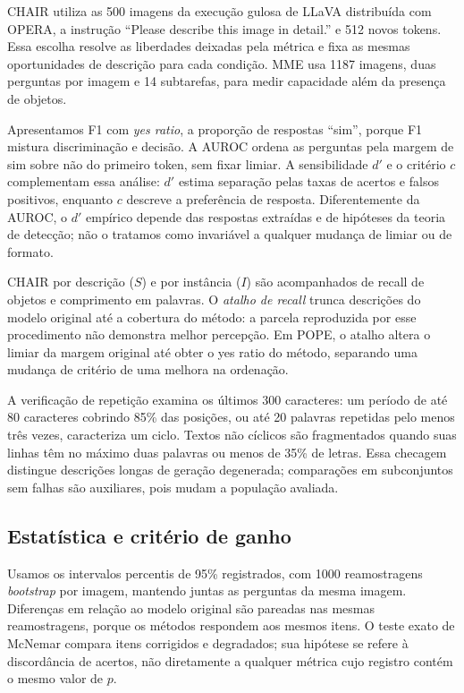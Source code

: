 CHAIR utiliza as 500 imagens da execução gulosa de LLaVA distribuída com OPERA, a instrução ``Please describe this image in detail.'' e 512 novos tokens. Essa escolha resolve as liberdades deixadas pela métrica e fixa as mesmas oportunidades de descrição para cada condição. MME usa 1187 imagens, duas perguntas por imagem e 14 subtarefas, para medir capacidade além da presença de objetos.

Apresentamos F1 com \textit{yes ratio}, a proporção de respostas ``sim'', porque F1 mistura discriminação e decisão. A AUROC ordena as perguntas pela margem de sim sobre não do primeiro token, sem fixar limiar. A sensibilidade $d'$ e o critério $c$ complementam essa análise: $d'$ estima separação pelas taxas de acertos e falsos positivos, enquanto $c$ descreve a preferência de resposta. Diferentemente da AUROC, o $d'$ empírico depende das respostas extraídas e de hipóteses da teoria de detecção; não o tratamos como invariável a qualquer mudança de limiar ou de formato.

CHAIR por descrição ($S$) e por instância ($I$) são acompanhados de recall de objetos e comprimento em palavras. O \emph{atalho de recall} trunca descrições do modelo original até a cobertura do método: a parcela reproduzida por esse procedimento não demonstra melhor percepção. Em POPE, o atalho altera o limiar da margem original até obter o yes ratio do método, separando uma mudança de critério de uma melhora na ordenação.

A verificação de repetição examina os últimos 300 caracteres: um período de até 80 caracteres cobrindo 85\% das posições, ou até 20 palavras repetidas pelo menos três vezes, caracteriza um ciclo. Textos não cíclicos são fragmentados quando suas linhas têm no máximo duas palavras ou menos de 35\% de letras. Essa checagem distingue descrições longas de geração degenerada; comparações em subconjuntos sem falhas são auxiliares, pois mudam a população avaliada.

\subsection{Estatística e critério de ganho}
Usamos os intervalos percentis de 95\% registrados, com 1000 reamostragens \textit{bootstrap} por imagem, mantendo juntas as perguntas da mesma imagem. Diferenças em relação ao modelo original são pareadas nas mesmas reamostragens, porque os métodos respondem aos mesmos itens. O teste exato de McNemar compara itens corrigidos e degradados; sua hipótese se refere à discordância de acertos, não diretamente a qualquer métrica cujo registro contém o mesmo valor de $p$.

